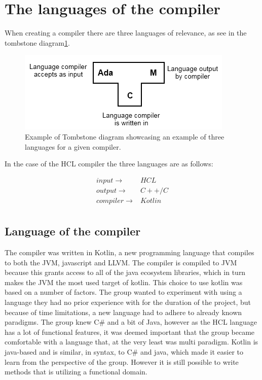 \section{The languages of the compiler}
When creating a compiler there are three languages of relevance, as see in the tombstone diagram\ref{fig:TStoneExample}.

\begin{figure}[H]
	\centering
	\includegraphics[width=\textwidth/2+\textwidth/4]{4.Solution/images/T-diagram.png}
	\caption{
		Example of Tombstone diagram showcasing an example of three languages for a given compiler.\cite{TStoneWiki}
	}
	\label{fig:TStoneExample}
\end{figure}
In the case of the HCL compiler the three languages are as follows:

\begin{align*}
input \to & HCL \\
output \to & C++/C \\
compiler \to & Kotlin \\
\end{align*}

\subsection{Language of the compiler}
The compiler was written in Kotlin\cite{KotlinWebsite}, a new programming language that compiles to both the JVM, javascript and LLVM. 
The compiler is compiled to JVM because this grants access to all of the java ecosystem libraries, which in turn makes the JVM the most used target of kotlin.
This choice to use kotlin was based on a number of factors.
The group wanted to experiment with using a language they had no prior experience with for the duration of the project, but because of time limitations, a new language had to adhere to already known paradigms.
The group knew C\# and a bit of Java, however as the HCL language has a lot of functional features, it was deemed important that the group became comfortable with a language that, at the very least was multi paradigm.
Kotlin is java-based and is similar, in syntax, to C\# and java, which made it easier to learn from the perspective of the group.
However it is still possible to write methods that is utilizing a functional domain.

